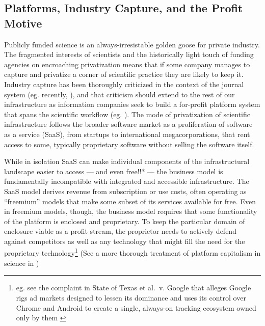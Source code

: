 \hypertarget{platforms-industry-capture-and-the-profit-motive}{%
\subsection{Platforms, Industry Capture, and the Profit
Motive}\label{platforms-industry-capture-and-the-profit-motive}}

Publicly funded science is an always-irresistable golden goose for
private industry. The fragmented interests of scientists and the
historically light touch of funding agencies on encroaching
privatization means that if some company manages to capture and
privatize a corner of scientific practice they are likely to keep it.
Industry capture has been thoroughly criticized in the context of the
journal system (eg. recently, \citep{brembsReplacingAcademicJournals2021} ), and that criticism should
extend to the rest of our infrastructure as information companies seek
to build a for-profit platform system that spans the scientific workflow
(eg. \citep{ElsevierSevenBridges2017} ). The mode of privatization
of scientific infrastructure follows the broader software market as a
proliferation of software as a service (SaaS), from startups to
international megacorporations, that rent access to some, typically
proprietary software without selling the software itself.

While in isolation SaaS can make individual components of the
infrastructural landscape easier to access --- and even free!!* --- the
business model is fundamentally incompatible with integrated and
accessible infrastructure. The SaaS model derives revenue from
subscription or use costs, often operating as ``freemium'' models that
make some subset of its services available for free. Even in freemium
models, though, the business model requires that some functionality of
the platform is enclosed and proprietary. To keep the particular domain
of enclosure viable as a profit stream, the proprietor needs to actively
defend against competitors as well as any technology that might fill the
need for the proprietary technology\footnote{eg. see the complaint in
  State of Texas et al.~v. Google that alleges Google rigs ad markets
  designed to lessen its dominance and uses its control over Chrome and
  Android to create a single, always-on tracking ecosystem owned only by
  them \citep{ReGoogleDigital2021} } (See a more thorough
treatment of platform capitalism in science in \citep{mirowskiFutureOpenScience2018} )

